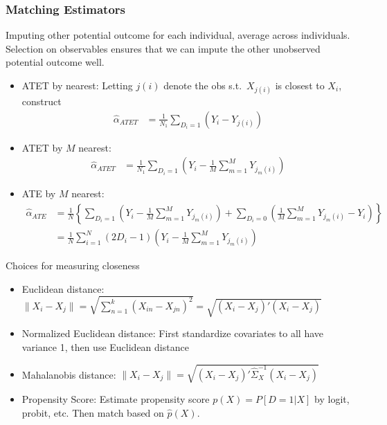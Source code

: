 \documentclass[12pt]{article}
\theoremstyle{plain}
\theoremstyle{definition}
\theoremstyle{remark}
\begin{document}
\clearpage
\subsubsection{Matching Estimators}

Imputing other potential outcome for each individual, average across
individuals.
Selection on observables ensures that we can impute the other
unobserved potential outcome well.
\begin{itemize}
  \item ATET by nearest:
    Letting $j(i)$ denote the obs s.t.\ $X_{j(i)}$ is
    closest to $X_i$, construct
    \begin{align*}
      \hat{\alpha}_{ATET}
      &=
      \frac{1}{N_1}
      \sum_{D_i=1}
      (Y_i-Y_{j(i)})
    \end{align*}
  \item ATET by $M$ nearest:
    \begin{align*}
      \hat{\alpha}_{ATET}
      &=
      \frac{1}{N_1}
      \sum_{D_i=1}
      \left(
      Y_i
      -
      \frac{1}{M}
      \sum_{m=1}^M
      Y_{j_m(i)}
      \right)
    \end{align*}
  \item ATE by $M$ nearest:
    \begin{align*}
      \hat{\alpha}_{ATE}
      &=
      \frac{1}{N}
      \left\{
      \sum_{D_i=1}
      \left(
      Y_i
      -
      \frac{1}{M}
      \sum_{m=1}^M
      Y_{j_m(i)}
      \right)
      +
      \sum_{D_i=0}
      \left(
      \frac{1}{M}
      \sum_{m=1}^M
      Y_{j_m(i)}
      -
      Y_i
      \right)
      \right\}
      \\
      &=
      \frac{1}{N}
      \sum_{i=1}^N
      (2D_i-1)
      \left(
      Y_i
      -
      \frac{1}{M}
      \sum_{m=1}^M
      Y_{j_m(i)}
      \right)
    \end{align*}
\end{itemize}
Choices for measuring closeness
\begin{itemize}
  \item Euclidean distance:
    $\lVert X_i-X_j\rVert=\sqrt{\sum_{n=1}^k
    (X_{in}-X_{jn})^2}=\sqrt{(X_i-X_j)'(X_i-X_j)}$
  \item Normalized Euclidean distance:
    First standardize covariates to all have variance 1, then use
    Euclidean distance
  \item Mahalanobis distance:
    $\lVert X_i-X_j\rVert= \sqrt{(X_i-X_j)'\hat{\Sigma}_X^{-1}(X_i-X_j)}$
  \item
    Propensity Score:
    Estimate propensity score
    $p(X)=P[D=1|X]$ by logit, probit, etc.
    Then match based on $\hat{p}(X)$.
\end{itemize}
\end{document}

